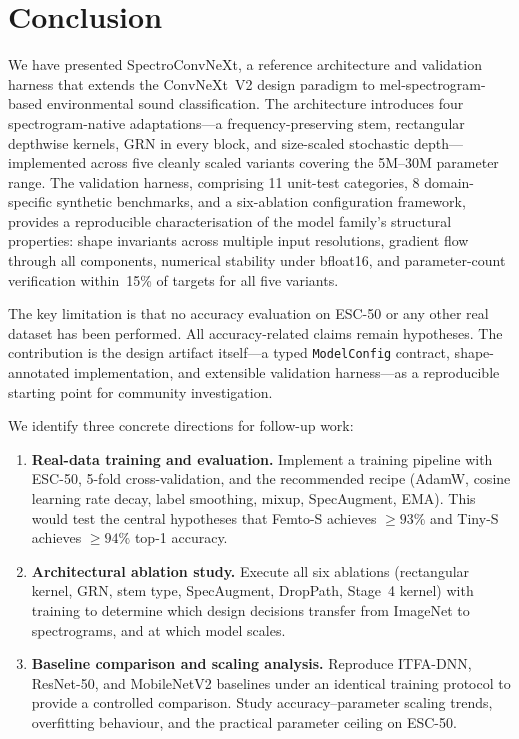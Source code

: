 \documentclass{article}
\begin{document}
\section{Conclusion}

We have presented SpectroConvNeXt, a reference architecture and validation
harness that extends the ConvNeXt~V2 design paradigm to mel-spectrogram-based
environmental sound classification. The architecture introduces four
spectrogram-native adaptations---a frequency-preserving stem, rectangular
depthwise kernels, GRN in every block, and size-scaled stochastic
depth---implemented across five cleanly scaled variants covering the 5M--30M
parameter range. The validation harness, comprising 11 unit-test categories,
8 domain-specific synthetic benchmarks, and a six-ablation configuration
framework, provides a reproducible characterisation of the model family's
structural properties: shape invariants across multiple input resolutions,
gradient flow through all components, numerical stability under bfloat16, and
parameter-count verification within~15\% of targets for all five variants.

The key limitation is that no accuracy evaluation on ESC-50 or any other
real dataset has been performed. All accuracy-related claims remain hypotheses.
The contribution is the design artifact itself---a typed \texttt{ModelConfig}
contract, shape-annotated implementation, and extensible validation harness---as
a reproducible starting point for community investigation.

We identify three concrete directions for follow-up work:

\begin{enumerate}
  \item \textbf{Real-data training and evaluation.} Implement a training
  pipeline with ESC-50, 5-fold cross-validation, and the recommended recipe
  (AdamW, cosine learning rate decay, label smoothing, mixup, SpecAugment, EMA).
  This would test the central hypotheses that Femto-S achieves $\geq 93\%$ and
  Tiny-S achieves $\geq 94\%$ top-1 accuracy.
  \item \textbf{Architectural ablation study.} Execute all six ablations
  (rectangular kernel, GRN, stem type, SpecAugment, DropPath, Stage~4 kernel)
  with training to determine which design decisions transfer from ImageNet to
  spectrograms, and at which model scales.
  \item \textbf{Baseline comparison and scaling analysis.} Reproduce ITFA-DNN,
  ResNet-50, and MobileNetV2 baselines under an identical training protocol to
  provide a controlled comparison. Study accuracy--parameter scaling trends,
  overfitting behaviour, and the practical parameter ceiling on ESC-50.
\end{enumerate}
\end{document}
